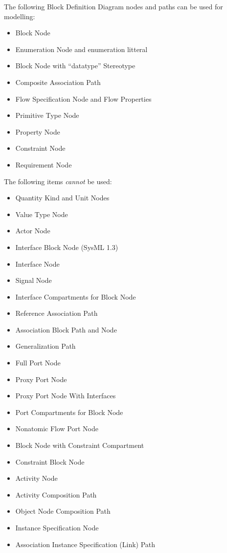 The following Block Definition Diagram nodes and paths can be used for
modelling:
\begin{itemize}
\item Block Node 
\item Enumeration Node  and enumeration litteral
\item Block Node with ``datatype'' Stereotype 
\item Composite Association Path 
\item Flow Specification Node  and
  Flow Properties
\item Primitive Type Node
\item Property Node
\item Constraint Node
\item Requirement Node
\end{itemize}

The following items \emph{cannot} be used:
\begin{itemize}
\item Quantity Kind and Unit Nodes
\item Value Type Node
\item Actor Node
\item Interface Block Node (SysML 1.3)
\item Interface Node
\item Signal Node
\item Interface Compartments for Block Node
\item Reference Association Path
\item Association Block Path and Node
\item Generalization Path
\item Full Port Node
\item Proxy Port Node
\item Proxy Port Node With Interfaces
\item Port Compartments for Block Node
\item Nonatomic Flow Port Node
\item Block Node with Constraint Compartment
\item Constraint Block Node
\item Activity Node
\item Activity Composition Path
\item Object Node Composition Path
\item Instance Specification Node
\item Association Instance Specification (Link) Path
\end{itemize}

